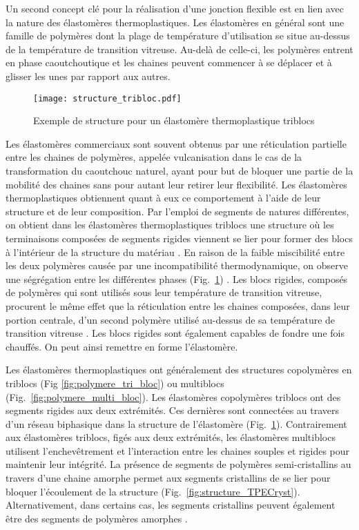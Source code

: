 Un second concept clé pour la réalisation d'une jonction flexible est en lien avec la nature des élastomères thermoplastiques. 
Les élastomères en général sont une famille de polymères dont la plage de température d'utilisation se situe au-dessus de la température de transition vitreuse. 
Au-delà de celle-ci, les polymères entrent en phase caoutchoutique et les chaines peuvent commencer à se déplacer et à glisser les unes par rapport aux autres. 

\begin{figure}[h]
	\centering
	\texttt{[image: structure\_tribloc.pdf]}
	\caption{Exemple de structure pour un élastomère thermoplastique triblocs}
	\label{fig:structure_tribloc}
\end{figure}

Les élastomères commerciaux sont souvent obtenus par une réticulation partielle entre les chaines de polymères, appelée vulcanisation dans le cas de la transformation du  caoutchouc naturel, ayant pour but de bloquer une partie de la mobilité des chaines sans pour autant leur retirer leur flexibilité. 
Les élastomères thermoplastiques obtiennent quant à eux ce comportement à l'aide de leur structure et de leur composition. 
Par l'emploi de segments de natures différentes, on obtient dans les élastomères thermoplastiques triblocs une structure où les terminaisons composées de segments rigides viennent se lier pour former des blocs à l'intérieur de la structure du matériau \cite{Holden1969}. 
En raison de la faible miscibilité entre les deux polymères causée par une incompatibilité thermodynamique, on observe une ségrégation entre les différentes phases (Fig.~\ref{fig:structure_tribloc}) \cite{Scott1952c}. 
Les blocs rigides, composés de polymères qui sont utilisés sous leur température de transition vitreuse, procurent le même effet que la réticulation entre les chaines composées, dans leur portion centrale, d'un second polymère utilisé au-dessus de sa température de transition vitreuse \cite{Holden2002}. 
Les blocs rigides sont également capables de fondre une fois chauffés.
On peut ainsi remettre en forme l'élastomère. 

Les élastomères thermoplastiques ont généralement des structures copolymères en triblocs (Fig \ref{fig:polymere_tri_bloc}) ou multiblocs (Fig.~\ref{fig:polymere_multi_bloc}). 
Les élastomères copolymères triblocs ont des segments rigides aux deux extrémités. 
Ces dernières sont connectées au travers d'un réseau biphasique dans la structure de l'élastomère (Fig.~\ref{fig:structure_tribloc}). 
Contrairement aux élastomères triblocs, figés aux deux extrémités, les élastomères multiblocs utilisent l'enchevêtrement et l'interaction entre les chaines souples et rigides pour maintenir leur intégrité. 
La présence de segments de polymères semi-cristallins au travers d'une chaine amorphe permet aux segments cristallins de se lier pour bloquer l'écoulement de la structure (Fig.~\ref{fig:structure_TPECryst}). 
Alternativement, dans certains cas, les segments cristallins peuvent également être des segments de polymères amorphes \cite{Holden2002}. 


